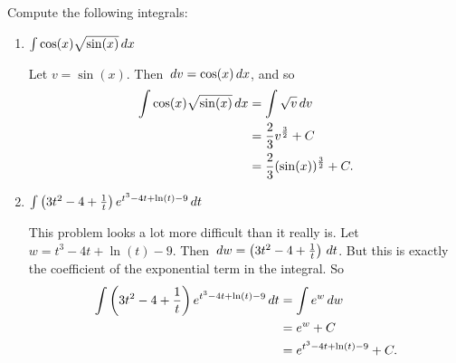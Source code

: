 \documentclass[nooutcomes]{ximera}
\begin{document}
\begin{problem}
Compute the following integrals:

	\begin{enumerate}
	
	\item  $\int \cos(x) \sqrt{\sin(x)} \,d x$
		\begin{freeResponse}
		Let $v = \sin(x)$.  Then $\,d v = \cos(x) \,d x$, and so
			\begin{align*}
			\int \cos(x) \sqrt{\sin(x)} \,d x &= \int \sqrt{v} \,d v  \\
			&= \frac{2}{3} v^{\frac{3}{2}} + C  \\
			&= \frac{2}{3} (\sin(x))^{\frac{3}{2}} + C.
			\end{align*}
		\end{freeResponse}
		
		
		
	\item  $\int \left( 3t^2 - 4 + \frac{1}{t} \right) e^{t^3 - 4t + \ln(t) - 9} \,d t$
		\begin{freeResponse}
		This problem looks a lot more difficult than it really is.  Let $w=t^3 - 4t + \ln(t) - 9$.  
		Then $\,d w = \left( 3t^2 - 4 + \frac{1}{t} \right) \,d t$.  But this is exactly the coefficient of the exponential term in the integral.  So
			\begin{align*}
			\int \left( 3t^2 - 4 + \frac{1}{t} \right) e^{t^3 - 4t + \ln(t) - 9} \,d t &= \int e^w \,d w  \\
			&= e^w + C  \\
			&= e^{t^3 - 4t + \ln(t) - 9} + C.
			\end{align*}
		\end{freeResponse}
		
		
		
	\end{enumerate}
		
		
		

\end{problem}
	
	
	
	
	
	
	
	
			
			
\end{document}
